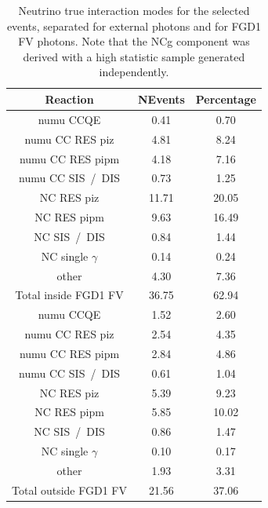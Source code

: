 \begin{table}[ht]
  \begin{adjustbox}{center}
    \begin{tabular}{ccc}
      \toprule
      Reaction & NEvents & Percentage \\
      \midrule
      \gls{numu} \Gls{CCQE}                    & 0.41 & 0.70  \\
      \gls{numu} \Gls{CC} \Gls{RES} \gls{piz}  & 4.81 & 8.24  \\
      \gls{numu} \Gls{CC} \Gls{RES} \gls{pipm} & 4.18 & 7.16  \\
      \gls{numu} \Gls{CC} \Gls{SIS}~/~\Gls{DIS}& 0.73 & 1.25  \\
      \Gls{NC} \Gls{RES} \gls{piz}             & 11.71& 20.05 \\
      \Gls{NC} \Gls{RES} \gls{pipm}            & 9.63 & 16.49 \\
      \Gls{NC} \Gls{SIS}~/~\Gls{DIS}           & 0.84 & 1.44  \\
      \Gls{NC} single $\gamma$                 & 0.14 & 0.24  \\
      other                                    & 4.30 & 7.36  \\
      \midrule
      Total inside \Gls{FGD}1 \Gls{FV}         & 36.75& 62.94 \\
      \midrule
      \gls{numu} \Gls{CCQE}                    & 1.52 & 2.60  \\
      \gls{numu} \Gls{CC} \Gls{RES} \Gls{piz}  & 2.54 & 4.35  \\
      \gls{numu} \Gls{CC} \Gls{RES} \Gls{pipm} & 2.84 & 4.86  \\
      \gls{numu} \Gls{CC} \Gls{SIS}~/~\Gls{DIS}& 0.61 & 1.04  \\
      \Gls{NC} \Gls{RES} \Gls{piz}             & 5.39 & 9.23  \\
      \Gls{NC} \Gls{RES} \Gls{pipm}            & 5.85 & 10.02 \\
      \Gls{NC} \Gls{SIS}~/~\Gls{DIS}           & 0.86 & 1.47  \\
      \Gls{NC} single $\gamma$                 & 0.10 & 0.17 \\
      other                                    & 1.93 & 3.31  \\
      \midrule
      Total outside \Gls{FGD}1 \Gls{FV}        & 21.56 & 37.06 \\ 
      \bottomrule
    \end{tabular}
  \end{adjustbox}
  \caption[Neutrino true interaction modes for the selected
  events]{Neutrino true interaction modes for the selected events,
    separated for external photons and for \Gls{FGD}1 \Gls{FV}
    photons.  Note that the \Gls{NCg} component was derived with a
    high statistic sample generated independently.}
  \label{tab:reaction}
\end{table}


